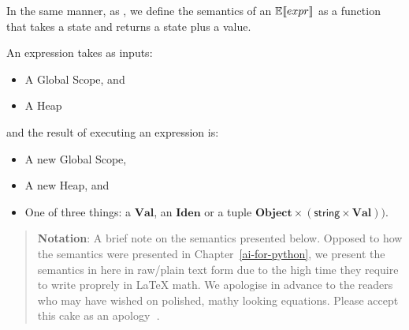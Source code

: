 In the same manner, as \textcite{fromherz_static_2018}, we define the semantics of an
\(\mathbb{E}\!\left\llbracket expr \right\rrbracket\) as a function that takes a state and returns a state plus a value.

An expression takes as inputs:

\begin{itemize}
\tightlist
\item A Global Scope, and
\item A Heap
\end{itemize}

and the result of executing an expression is:

\begin{itemize}
\tightlist
\item A new Global Scope,
\item A new Heap, and
\item One of three things: a \(\mathbf{Val}\), an \(\mathbf{Iden}\) or a tuple
  \(\mathbf{Object} \times (\textsf{string} \times \mathbf{Val}))\).
\end{itemize}


\begin{quote}
\textbf{Notation}: A brief note on the semantics presented below. Opposed to how
the semantics were presented in Chapter~\ref{ai-for-python}, we present the semantics in
here in raw/plain text form due to the high time they require to write proprely in
\LaTeX{} math. We apologise in advance to the readers who may have wished on polished, mathy
looking equations. Please accept this cake as an apology {\notoemojifont 🍰}.
\end{quote}

